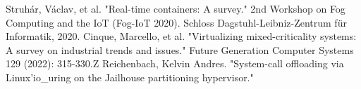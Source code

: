 \documentclass[a4paper, 11pt]{article}
\theoremstyle{nonumberplain}
\begin{document}
\begin{thebibliography}{3}
     Struhár, Václav, et al.
        "Real-time containers:
        A survey." 2nd Workshop on Fog Computing and the IoT (Fog-IoT 2020).
        Schloss Dagstuhl-Leibniz-Zentrum für Informatik, 2020.
        Cinque, Marcello, et al.
        "Virtualizing mixed-criticality systems:
        A survey on industrial trends and issues."
        Future Generation Computer Systems 129 (2022): 315-330.Z
        Reichenbach, Kelvin Andres.
        "System-call offloading via Linux’io\_uring on the
        Jailhouse partitioning hypervisor."
\end{thebibliography}
\end{document}
